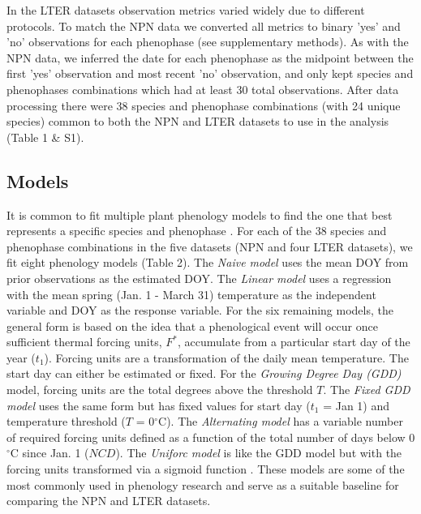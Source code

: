 \documentclass[fleqn,12pt,lineno]{article}
\begin{document}
In the LTER datasets observation metrics varied widely due to different protocols. To match the NPN data we converted all metrics to binary 'yes' and 'no' observations for each phenophase (see supplementary methods). As with the NPN data, we inferred the date for each phenophase as the midpoint between the first 'yes' observation and most recent 'no' observation, and only kept species and phenophases combinations which had at least 30 total observations. After data processing there were 38 species and phenophase combinations (with 24 unique species) common to both the NPN and LTER datasets to use in the analysis (Table 1 \& S1).

\subsection*{Models}

It is common to fit multiple plant phenology models to find the one that best represents a specific species and phenophase \citep{chuine2013}. For each of the 38 species and phenophase combinations in the five datasets (NPN and four LTER datasets), we fit eight phenology models (Table 2). The \textit{Naive model} uses the mean DOY from prior observations as the estimated DOY. The \textit{Linear model} uses a regression with the mean spring (Jan. 1 - March 31) temperature as the independent variable and DOY as the response variable. For the six remaining models, the general form is based on the idea that a phenological event will occur once sufficient thermal forcing units, $F^{*}$, accumulate from a particular start day of the year ($t_{1}$). Forcing units are a transformation of the daily mean temperature. The start day can either be estimated or fixed. For the \textit{Growing Degree Day (GDD)} model, forcing units are the total degrees above the threshold $T$. The \textit{Fixed GDD model} uses the same form but has fixed values for start day ($t_{1}$ = Jan 1) and temperature threshold ($T$ = 0$^{\circ}$C). The \textit{Alternating model} has a variable number of required forcing units defined as a function of the total number of days below 0$^{\circ}$C since Jan. 1 ($NCD$). The \textit{Uniforc model} is like the GDD model but with the forcing units transformed via a sigmoid function \citep{chuine2000}. These models are some of the most commonly used in phenology research and serve as a suitable baseline for comparing the NPN and LTER datasets.
\end{document}
